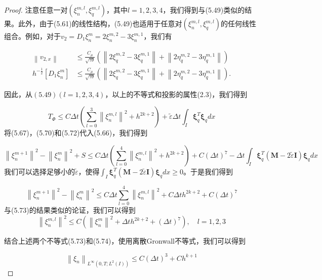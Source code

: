 \begin{proof}
    注意任意一对$\left(\xi_{n}^{m, l}, \xi_{q}^{m, l}\right)$，其中$l=1,2,3,4$，我们得到与(5.49)类似的结果。此外，由于(5.61)的线性结构，(5.49)也适用于任意对$\left(\xi_{n}^{m, l}, \xi_{q}^{m, l}\right)$的任何线性组合。例如，对于$v_{2}=D_{1} \xi_{n}^{m}=2 \xi_{n}^{m, 2}-3 \xi_{n}^{m, 1}$，我们有

    \begin{align*}
        \left\|v_{2, x}\right\|                        & \leq \frac{C_{\mu}}{\sqrt{\tau \theta}}\left(\left\|2 \xi_{q}^{m, 2}-3 \xi_{q}^{m, 1}\right\|+\left\|2 \eta_{q}^{m, 2}-3 \eta_{q}^{m, 1}\right\|\right)   \\
        h^{-\frac{1}{2}}\left[D_{1} \xi_{n}^{m}\right] & \leq \frac{C_{\mu}}{\sqrt{\tau \theta}}\left(\left\|2 \xi_{q}^{m, 2}-3 \xi_{q}^{m, 1}\right\|+\left\|2 \eta_{q}^{m, 2}-3 \eta_{q}^{m, 1}\right\|\right) .
    \end{align*}

    因此，从$(5.49)(l=1,2,3,4)$，以上的不等式和投影的属性(2.3)，我们得到

    \begin{equation}
        T_{\Phi} \leq C \Delta t\left(\sum_{l=0}^{3}\left\|\xi_{n}^{m, l}\right\|^{2}+h^{2 k+2}\right)+\tilde{\varepsilon} \Delta t \int_{I} \boldsymbol{\xi}_{q}^{T} \boldsymbol{\xi}_{q} d x
    \end{equation}
    将(5.67)，(5.70)和(5.72)代入(5.66)，我们得到

    \begin{equation}
        \left\|\xi_{n}^{m+1}\right\|^{2}-\left\|\xi_{n}^{m}\right\|^{2}+S \leq C \Delta t\left(\sum_{l=0}^{4}\left\|\xi_{n}^{m, l}\right\|^{2}+h^{2 k+2}\right)+C(\Delta t)^{7}-\Delta t \int_{I} \boldsymbol{\xi}_{q}^{T}(\boldsymbol{M}-2 \tilde{\varepsilon} \boldsymbol{I}) \boldsymbol{\xi}_{q} d x
    \end{equation}
    我们可以选择足够小的$\tilde{\varepsilon}$，使得$\int_{I} \boldsymbol{\xi}_{q}^{T}(\boldsymbol{M}-2 \tilde{\varepsilon} \boldsymbol{I}) \boldsymbol{\xi}_{q} d x \geq 0$。于是我们得到

    \begin{equation}
        \left\|\xi_{n}^{m+1}\right\|^{2}-\left\|\xi_{n}^{m}\right\|^{2} \leq C \Delta t \sum_{l=0}^{4}\left\|\xi_{n}^{m, l}\right\|^{2}+C \Delta t h^{2 k+2}+C(\Delta t)^{7}
    \end{equation}
    与(5.73)的结果类似的论证，我们可以得到
    \begin{equation}
        \left\|\xi_{n}^{m, l}\right\|^{2} \leq C\left(\left\|\xi_{n}^{m}\right\|^{2}+\Delta t h^{2 k+2}+(\Delta t)^{7}\right), \quad l=1,2,3
    \end{equation}

    结合上述两个不等式(5.73)和(5.74)，使用离散Gronwall不等式，我们可以得到

    \begin{equation}
        \left\|\xi_{n}\right\|_{L^{\infty}\left(0, T ; L^{2}(I)\right)} \leq C(\Delta t)^{3}+C h^{k+1}
    \end{equation}
\end{proof}
